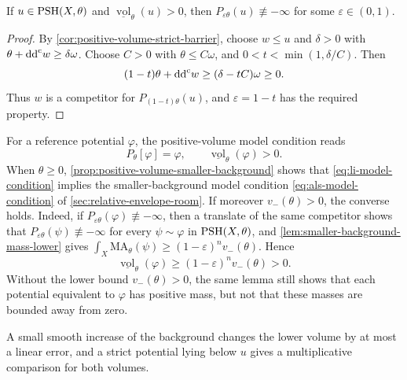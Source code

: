 \begin{proposition}\label{prop:positive-volume-smaller-background}
If $u\in\mathrm{PSH}(X,\theta)$ and
$\underline{\operatorname{vol}}_\theta(u)>0$, then
$P_{\varepsilon\theta}(u)\not\equiv-\infty$ for some $\varepsilon\in(0,1)$.
\end{proposition}
\begin{proof}
By \cref{cor:positive-volume-strict-barrier}, choose $w\leq u$ and $\delta>0$ with $\theta+\mathrm{dd}^{\mathrm{c}} w\geq\delta\omega$. Choose $C>0$ with $\theta\leq C\omega$, and $0<t<\min(1,\delta/C)$. Then
\[
 (1-t)\theta+\mathrm{dd}^{\mathrm{c}} w\geq(\delta-tC)\omega\geq0.
\]
Thus $w$ is a competitor for $P_{(1-t)\theta}(u)$, and $\varepsilon=1-t$ has the required property.
\end{proof}

For a reference potential $\varphi$, the positive-volume model condition reads
\begin{equation}\label{eq:li-model-condition}
 P_\theta[\varphi]=\varphi,\qquad
 \underline{\operatorname{vol}}_\theta(\varphi)>0.
\end{equation}
When $\theta\geq0$, \cref{prop:positive-volume-smaller-background} shows that \eqref{eq:li-model-condition} implies the smaller-background model condition \eqref{eq:als-model-condition} of \cref{sec:relative-envelope-room}. If moreover $v_-(\theta)>0$, the converse holds. Indeed, if $P_{\varepsilon\theta}(\varphi)\not\equiv-\infty$, then a translate of the same competitor shows that $P_{\varepsilon\theta}(\psi)\not\equiv-\infty$ for every $\psi\sim\varphi$ in $\mathrm{PSH}(X,\theta)$, and \cref{lem:smaller-background-mass-lower} gives $\int_X\mathrm{MA}_\theta(\psi)\geq(1-\varepsilon)^nv_-(\theta)$. Hence
\[
 \underline{\operatorname{vol}}_\theta(\varphi)
 \geq(1-\varepsilon)^n v_-(\theta)>0.
\]
Without the lower bound $v_-(\theta)>0$, the same lemma still shows that each potential equivalent to $\varphi$ has positive mass, but not that these masses are bounded away from zero.

A small smooth increase of the background changes the lower volume by at most a linear error, and a strict potential lying below $u$ gives a multiplicative comparison for both volumes.

